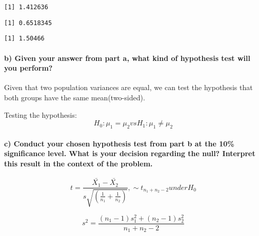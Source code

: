 \documentclass[
]{article}
\begin{document}
\begin{verbatim}
[1] 1.412636
\end{verbatim}

\begin{verbatim}
[1] 0.6518345
\end{verbatim}

\begin{verbatim}
[1] 1.50466
\end{verbatim}

\hypertarget{b-given-your-answer-from-part-a-what-kind-of-hypothesis-test-will-you-perform}{%
\paragraph{b) Given your answer from part a, what kind of hypothesis
test will you
perform?}\label{b-given-your-answer-from-part-a-what-kind-of-hypothesis-test-will-you-perform}}

Given that two population variances are equal, we can test the
hypothesis that both groups have the same mean(two-sided).

Testing the hypothesis:
\[H_0 : \mu_1 = \mu_2   vs   H_1 : \mu_1 \neq \mu_2\]

\hypertarget{c-conduct-your-chosen-hypothesis-test-from-part-b-at-the-10-significance-level.-what-is-your-decision-regarding-the-null-interpret-this-result-in-the-context-of-the-problem.}{%
\paragraph{c) Conduct your chosen hypothesis test from part b at the
10\% significance level. What is your decision regarding the null?
Interpret this result in the context of the
problem.}\label{c-conduct-your-chosen-hypothesis-test-from-part-b-at-the-10-significance-level.-what-is-your-decision-regarding-the-null-interpret-this-result-in-the-context-of-the-problem.}}

\[t = \frac{\bar{X_1}-\bar{X_2}}{s\sqrt{(\frac{1}{n_1}+\frac{1}{n_2})}}, \sim t_{n_1+n_2-2} under H_0\]

\[s^2 = \frac{(n_1-1)s_1^2+(n_2-1)s_2^2}{n_1+n_2-2}\]
\end{document}
